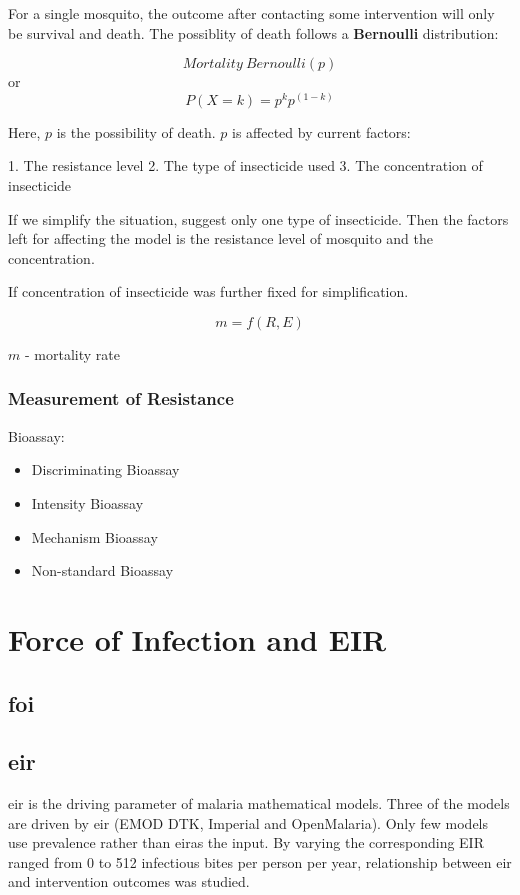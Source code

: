 \documentclass[a4paper, 12pt, twoside]{article}
\begin{document}
For a single mosquito, the outcome after contacting some intervention will only be survival and death.
The possiblity of death follows a \textbf{Bernoulli} distribution:

$$Mortality ~ Bernoulli(p)$$
or
$$P(X = k) = p^k p^{(1-k)}$$

Here, $p$ is the possibility of death. $p$ is affected by current factors:

1. The resistance level
2. The type of insecticide used
3. The concentration of insecticide

If we simplify the situation, suggest only one type of insecticide.
Then the factors left for affecting the model is the resistance level of mosquito and the concentration.

If concentration of insecticide was further fixed for simplification. 

$$m = f(R, E)$$

$m$ - mortality rate

\subsubsection{Measurement of Resistance}

Bioassay:

\begin{itemize}
	\item Discriminating Bioassay
	\item Intensity Bioassay
	\item Mechanism Bioassay
	\item Non-standard Bioassay
\end{itemize}

\section{Force of Infection and EIR}%
\label{sec:force_of_infection_and_eir}

\subsection{\texorpdfstring{\gls{foi}}{Force of Infection}}%
\label{sub:foi}

\subsection{\texorpdfstring{\gls{eir}}{EIR}}%
\label{sub:eir}
\gls{eir} is the driving parameter of malaria mathematical models.
Three of the models are driven by \gls{eir} (EMOD DTK, Imperial and OpenMalaria).
Only few models use prevalence rather than \gls{eir}as the input.
By varying the corresponding EIR ranged from 0 to 512 infectious bites per person per year, relationship between \gls{eir} and intervention outcomes was studied.
\end{document}
